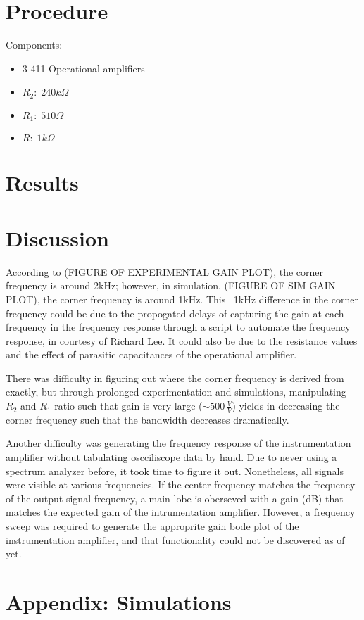\documentclass{article}
\begin{document}
\section{Procedure}
Components:
\begin{itemize}
    \item 3 411 Operational amplifiers
    \item $R_2:\;240k\Omega$
    \item $R_1:\;510\Omega$
    \item $R:\;1k\Omega$
\end{itemize}
\section{Results}
\section{Discussion}
According to (FIGURE OF EXPERIMENTAL GAIN PLOT), the corner frequency is around 2kHz; however, in simulation, (FIGURE OF SIM GAIN PLOT), the corner frequency is around 1kHz. This ~1kHz difference in the corner frequency could be due to the propogated delays of capturing the gain at each frequency in the frequency response through a script to automate the frequency response, in courtesy of Richard Lee. It could also be due to the resistance values and the effect of parasitic capacitances of the operational amplifier.

There was difficulty in figuring out where the corner frequency is derived from exactly, but through prolonged experimentation and simulations, manipulating $R_2$ and $R_1$ ratio such that gain is very large ($\sim500\,\frac{V}{V}$) yields in decreasing the corner frequency such that the bandwidth decreases dramatically.

Another difficulty was generating the frequency response of the instrumentation amplifier without tabulating oscciliscope data by hand. Due to never using a spectrum analyzer before, it took time to figure it out. Nonetheless, all signals were visible at various frequencies. If the center frequency matches the frequency of the output signal frequency, a main lobe is oberseved with a gain (dB) that matches the expected gain of the intrumentation amplifier. However, a frequency sweep was required to generate the approprite gain bode plot of the instrumentation amplifier, and that functionality could not be discovered as of yet.
\section{Appendix: Simulations}
\end{document}
